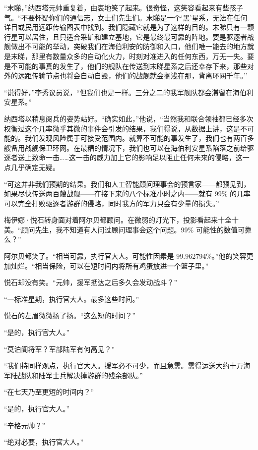 \documentclass[AutoFakeBold=true]{book}
\begin{document}
``末睇，''纳西塔元帅重复着，由衷地笑了起来。很奇怪，这笑容看起来有些孩子气。``不要怀疑你们的通信志，女士们先生们。末睇是一个`黑'星系，无法在任何详目或民用远距传输图表中找到。我们隐藏它就是为了这样的目的。末睇只有一颗行星可以居住，且只适合采矿和建立基地，它是最终最可靠的阵地。要是驱逐者战舰做出不可能的举动，突破我们在海伯利安的防御和入口，他们唯一能去的地方就是末睇，那里有数量众多的自动化火力，时刻对准进入的任何东西，万无一失。要是不可能的事真的发生了，他们的舰队在传送到末睇星系之后还幸存下来，那些对外的远距传输节点也将会自动自毁，他们的战舰就会搁浅在那，背离环网千年。''

``说得好，''李秀议员说，``但我们也是一样。三分之二的我军舰队都会滞留在海伯利安星系。''

纳西塔以稍息阅兵的姿势站好。``确实如此，''他说，``当然我和联合领袖都已经多次权衡过这个几率微乎其微的事件会引发的结果，我们得说，从数据上讲，这是不可能的。我们发现风险属于可接受范围内。就算不可能的事发生了，我们也有两百多艘备用战舰保卫环网。在最糟的情况下，我们也可以在海伯利安星系陷落之前给驱逐者送上致命一击……这一击的威力加上它的影响足以阻止任何未来的侵略，这一点几乎确定无疑。

``{\kaishu 可这并非我们预期的结果}。我们和人工智能顾问理事会的预言家——都预见到，如果尽快传送两百艘战舰——在接下来的八个标准小时之内——就有 99\% 的几率可以完全打败驱逐者游群的侵略，同时我方的军力只会有少量的损失。''

梅伊娜·悦石转身面对着阿尔贝都顾问。在微弱的灯光下，投影看起来十全十美。``顾问先生，我不知道有人问过顾问理事会这个问题。99\% 可能性的数值可靠么？''

阿尔贝都笑了。``相当可靠，执行官大人。可能性因素是 99.962794\%。''他的笑容更加灿烂。``相当保险，可以在短时间内将所有鸡蛋放进一个篮子里。''

悦石却没有笑。``元帅，援军抵达之后多久会发动战斗？''

``一标准星期，执行官大人。最多这些时间。''

悦石的左眉微微扬了扬。``这么短的时间？''

``是的，执行官大人。''

``莫泊阁将军？军部陆军有何高见？''

``我们持同样观点，执行官大人。援军必不可少，而且急需。需得运送大约十万海军陆战队和陆军士兵解决掉游群的残余部队。''

``在七天乃至更短的时间内？''

``是的，执行官大人。''

``辛格元帅？''

``绝对必要，执行官大人。''
\end{document}
